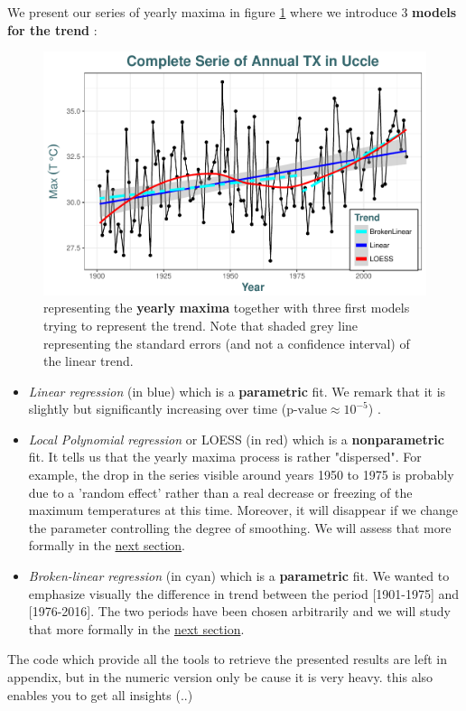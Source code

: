 \documentclass[11pt,a4paper,openany ]{book}
\begin{document}
We present our series of yearly maxima in figure \ref{first_fig} where we introduce 3 \textbf{models for the trend} :


\begin{figure}[!htb]
	\centering\includegraphics[width=.8\linewidth]{gg12.pdf}\caption{representing the \textbf{yearly} \textbf{maxima} together with three first models trying to represent the trend. Note that shaded grey line representing the standard errors (and not a confidence interval) of the linear trend.}\label{first_fig}
\end{figure}


\begin{itemize}
\item \emph{Linear regression } (in blue) which is a \textbf{parametric} fit. We remark that it is slightly but significantly increasing over time ($\text{p-value}\approx 10^{-5}$) . 
\item \emph{Local Polynomial regression } or LOESS (in red) which is a \textbf{nonparametric} fit. It tells us that the yearly maxima process is rather "dispersed". For example, the drop in the series visible around years 1950 to 1975 is probably due to a 'random effect' rather than a real decrease or freezing of the maximum temperatures at this time. Moreover, it will disappear if we change the parameter controlling the degree of smoothing. We will assess that more formally in the \hyperref[sec:splines]{next section}.
\item \emph{Broken-linear regression} (in cyan) which is a \textbf{parametric} fit. We wanted to emphasize visually the difference in trend between the period [1901-1975] and [1976-2016]. The two periods have been chosen arbitrarily and we will study that more formally in the \hyperref[sec:splines]{next section}.
\end{itemize}


The code which provide all the tools to retrieve the presented results are left in appendix, but in the numeric version only be cause it is very heavy. this also enables you to get all insights (..)
\end{document}
